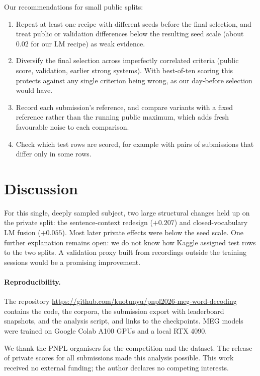 \documentclass{article}
\begin{document}
Our recommendations for small public splits:
\begin{enumerate}
\item Repeat at least one recipe with different seeds before the final selection, and treat public or validation differences below the resulting seed scale (about 0.02 for our LM recipe) as weak evidence.
\item Diversify the final selection across imperfectly correlated criteria (public score, validation, earlier strong systems). With best-of-ten scoring this protects against any single criterion being wrong, as our day-before selection would have.
\item Record each submission's reference, and compare variants with a fixed reference rather than the running public maximum, which adds fresh favourable noise to each comparison.
\item Check which test rows are scored, for example with pairs of submissions that differ only in some rows.
\end{enumerate}

\section{Discussion}
For this single, deeply sampled subject, two large structural changes held up on the private split: the sentence-context redesign ($+0.207$) and closed-vocabulary LM fusion ($+0.055$). Most later private effects were below the seed scale. One further explanation remains open: we do not know how Kaggle assigned test rows to the two splits. A validation proxy built from recordings outside the training sessions would be a promising improvement.

\paragraph{Reproducibility.} The repository \url{https://github.com/kuotunyu/pnpl2026-meg-word-decoding} contains the code, the corpora, the submission export with leaderboard snapshots, and the analysis script, and links to the checkpoints. MEG models were trained on Google Colab A100 GPUs and a local RTX 4090.

\begin{ack}
We thank the PNPL organisers for the competition and the dataset. The release of private scores for all submissions made this analysis possible. This work received no external funding; the author declares no competing interests.
\end{ack}
\end{document}
